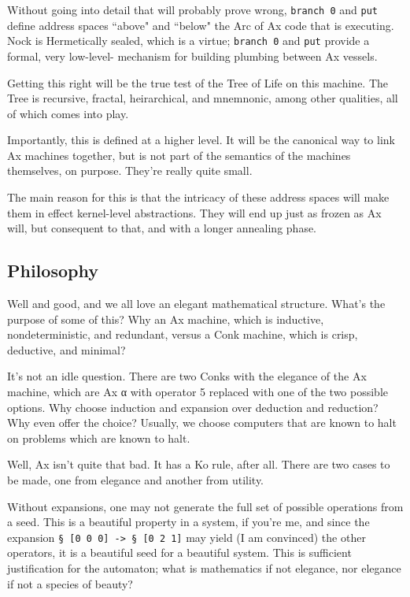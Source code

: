 \documentclass[twoside]{article}
\begin{document}
Without going into detail that will probably prove wrong, \texttt{branch 0} and \texttt{put} define address spaces ``above" and ``below" the Arc of Ax code that is executing. Nock is Hermetically sealed, which is a virtue; \texttt{branch 0} and \texttt{put} provide a formal, very low-level- mechanism for building plumbing between Ax vessels. 

Getting this right will be the true test of the Tree of Life on this machine. The Tree is recursive, fractal, heirarchical, and mnemnonic, among other qualities, all of which comes into play.

Importantly, this is defined at a higher level. It will be the canonical way to link Ax machines together, but is not part of the semantics of the machines themselves, on purpose. They're really quite small. 

The main reason for this is that the intricacy of these address spaces will make them in effect kernel-level abstractions. They will end up just as frozen as Ax will, but consequent to that, and with a longer annealing phase. 

\subsection{Philosophy}

Well and good, and we all love an elegant mathematical structure. What's the purpose of some of this? Why an Ax machine, which is inductive, nondeterministic, and redundant, versus a Conk machine, which is crisp, deductive, and minimal?

It's not an idle question. There are two Conks with the elegance of the Ax machine, which are Ax α with operator 5 replaced with one of the two possible options. Why choose induction and expansion over deduction and reduction? Why even offer the choice? Usually, we choose computers that are known to halt on problems which are known to halt. 

Well, Ax isn't quite that bad. It has a Ko rule, after all. There are two cases to be made, one from elegance and another from utility.

Without expansions, one may not generate the full set of possible operations from a seed. This is a beautiful property in a system, if you're me, and since the expansion \texttt{§ [0 0 0] -> § [0 2 1]} may yield (I am convinced) the other operators, it is a beautiful seed for a beautiful system. This is sufficient justification for the automaton; what is mathematics if not elegance, nor elegance if not a species of beauty?
\end{document}
